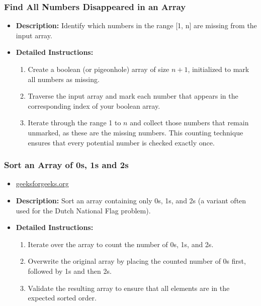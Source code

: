 \subsubsection{Find All Numbers Disappeared in an Array}
\begin{itemize}
    \item \textbf{Description:} Identify which numbers in the range [1, n] are missing from the input array.
    \item \textbf{Detailed Instructions:}
    \begin{enumerate}
        \item Create a boolean (or pigeonhole) array of size \(n+1\), initialized to mark all numbers as missing.
        \item Traverse the input array and mark each number that appears in the corresponding index of your boolean array.
        \item Iterate through the range 1 to \(n\) and collect those numbers that remain unmarked, as these are the missing numbers. This counting technique ensures that every potential number is checked exactly once.
    \end{enumerate}
\end{itemize}

\subsubsection{Sort an Array of 0s, 1s and 2s}
\begin{itemize}
    \item \href{https://www.geeksforgeeks.org/sort-an-array-of-0s-1s-and-2s/}{geeksforgeeks.org}
    \item \textbf{Description:} Sort an array containing only 0s, 1s, and 2s (a variant often used for the Dutch National Flag problem).
    \item \textbf{Detailed Instructions:}
    \begin{enumerate}
        \item Iterate over the array to count the number of 0s, 1s, and 2s.
        \item Overwrite the original array by placing the counted number of 0s first, followed by 1s and then 2s.
        \item Validate the resulting array to ensure that all elements are in the expected sorted order.
    \end{enumerate}
\end{itemize}

